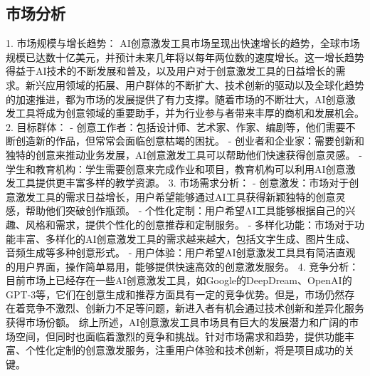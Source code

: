 \subsection{市场分析}
1. 市场规模与增长趋势：
AI创意激发工具市场呈现出快速增长的趋势，全球市场规模已达数十亿美元，并预计未来几年将以每年两位数的速度增长。这一增长趋势得益于AI技术的不断发展和普及，以及用户对于创意激发工具的日益增长的需求。新兴应用领域的拓展、用户群体的不断扩大、技术创新的驱动以及全球化趋势的加速推进，都为市场的发展提供了有力支撑。随着市场的不断壮大，AI创意激发工具将成为创意领域的重要助手，并为行业参与者带来丰厚的商机和发展机会。
2. 目标群体：
- 创意工作者：包括设计师、艺术家、作家、编剧等，他们需要不断创造新的作品，但常常会面临创意枯竭的困扰。
- 创业者和企业家：需要创新和独特的创意来推动业务发展，AI创意激发工具可以帮助他们快速获得创意灵感。
- 学生和教育机构：学生需要创意来完成作业和项目，教育机构可以利用AI创意激发工具提供更丰富多样的教学资源。
3. 市场需求分析：
- 创意激发：市场对于创意激发工具的需求日益增长，用户希望能够通过AI工具获得新颖独特的创意灵感，帮助他们突破创作瓶颈。
- 个性化定制：用户希望AI工具能够根据自己的兴趣、风格和需求，提供个性化的创意推荐和定制服务。
- 多样化功能：市场对于功能丰富、多样化的AI创意激发工具的需求越来越大，包括文字生成、图片生成、音频生成等多种创意形式。
- 用户体验：用户希望AI创意激发工具具有简洁直观的用户界面，操作简单易用，能够提供快速高效的创意激发服务。
4. 竞争分析：
目前市场上已经存在一些AI创意激发工具，如Google的DeepDream、OpenAI的GPT-3等，它们在创意生成和推荐方面具有一定的竞争优势。但是，市场仍然存在着竞争不激烈、创新力不足等问题，新进入者有机会通过技术创新和差异化服务获得市场份额。
综上所述，AI创意激发工具市场具有巨大的发展潜力和广阔的市场空间，但同时也面临着激烈的竞争和挑战。针对市场需求和趋势，提供功能丰富、个性化定制的创意激发服务，注重用户体验和技术创新，将是项目成功的关键。
